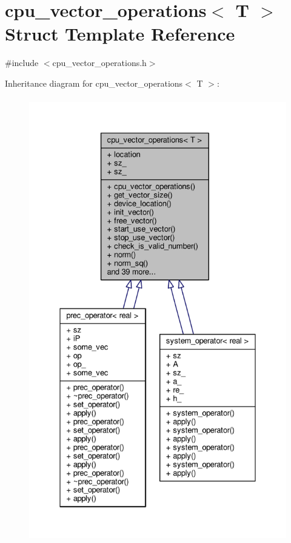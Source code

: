 \hypertarget{structcpu__vector__operations}{\section{cpu\-\_\-vector\-\_\-operations$<$ T $>$ Struct Template Reference}
\label{structcpu__vector__operations}
}


{\ttfamily \#include $<$cpu\-\_\-vector\-\_\-operations.\-h$>$}



Inheritance diagram for cpu\-\_\-vector\-\_\-operations$<$ T $>$\-:
\nopagebreak
\begin{figure}[H]
\begin{center}
\leavevmode
\includegraphics[height=550pt]{structcpu__vector__operations__inherit__graph}
\end{center}
\end{figure}


